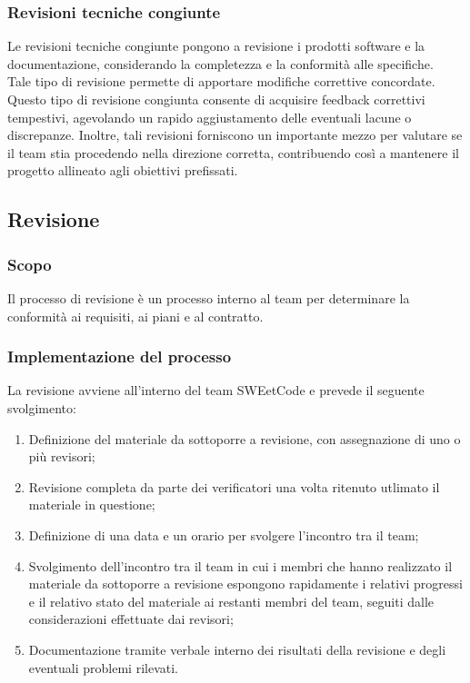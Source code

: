 \documentclass[10pt, a4paper]{article}
\begin{document}
\subsubsection{Revisioni tecniche congiunte}
Le revisioni tecniche congiunte pongono a revisione i prodotti software e la documentazione, considerando la completezza e la conformità alle specifiche.\\
Tale tipo di revisione permette di apportare modifiche correttive concordate. Questo tipo di revisione congiunta consente di acquisire feedback 
correttivi tempestivi, agevolando un rapido aggiustamento delle eventuali lacune o discrepanze. Inoltre, tali revisioni forniscono un importante 
mezzo per valutare se il team stia procedendo nella direzione corretta, contribuendo così a mantenere il progetto allineato agli obiettivi 
prefissati.

\subsection{Revisione}
\subsubsection{Scopo}
Il processo di revisione è un processo interno al team per determinare la conformità ai requisiti, ai piani e al contratto.

\subsubsection{Implementazione del processo}
La revisione avviene all'interno del team SWEetCode e prevede il seguente svolgimento:
\begin{enumerate}
    \item Definizione del materiale da sottoporre a revisione, con assegnazione di uno o più revisori;
    \item Revisione completa da parte dei verificatori una volta ritenuto utlimato il materiale in questione;
    \item Definizione di una data e un orario per svolgere l'incontro tra il team;
    \item Svolgimento dell'incontro tra il team in cui i membri che hanno realizzato il materiale da sottoporre a revisione espongono rapidamente 
    i relativi progressi e il relativo stato del materiale ai restanti membri del team, seguiti dalle considerazioni effettuate dai revisori;
    \item Documentazione tramite verbale interno dei risultati della revisione e degli eventuali problemi rilevati.
\end{enumerate}
\end{document}
